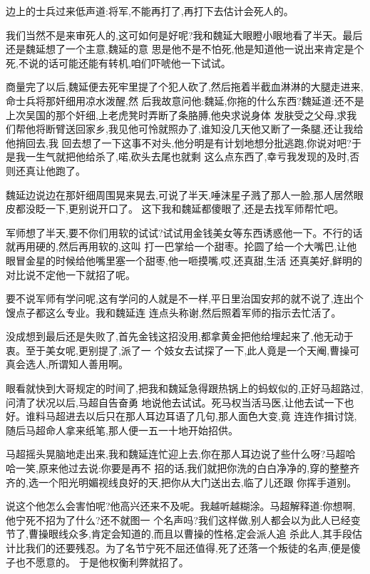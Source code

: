 ﻿\documentclass[12pt,twocolumn]{article}
\begin{document}
边上的士兵过来低声道:将军,不能再打了,再打下去估计会死人的。

我们当然不是来审死人的,这可如何是好呢?我和魏延大眼瞪小眼地看了半天。最后还是魏延想了一个主意,魏延的意
思是他不是不怕死,他是知道他一说出来肯定是个死,不说的话可能还能有转机,咱们吓唬他一下试试。

商量完了以后,魏延便去死牢里提了个犯人砍了,然后拖着半截血淋淋的大腿走进来,命士兵将那奸细用凉水泼醒,然
后我故意问他:魏延,你拖的什么东西?魏延道:还不是上次吴国的那个奸细,上老虎凳时弄断了条胳膊,他央求说身体
发肤受之父母,求我们帮他将断臂送回家乡,我见他可怜就照办了,谁知没几天他又断了一条腿,还让我给他捎回去,我
回去想了一下这事不对头,他分明是有计划地想分批逃跑,你说对吧?于是我一生气就把他给杀了,喏,砍头去尾也就剩
这么点东西了,幸亏我发现的及时,否则还真让他跑了。

魏延边说边在那奸细周围晃来晃去,可说了半天,唾沫星子溅了那人一脸,那人居然眼皮都没眨一下,更别说开口了。
这下我和魏延都傻眼了,还是去找军师帮忙吧。

军师想了半天,要不你们用软的试试?试试用金钱美女等东西诱惑他一下。不行的话就再用硬的,然后再用软的,这叫
打一巴掌给一个甜枣。抡圆了给一个大嘴巴,让他眼冒金星的时候给他嘴里塞一个甜枣,他一咂摸嘴,哎,还真甜,生活
还真美好,鲜明的对比说不定他一下就招了呢。

要不说军师有学问呢,这有学问的人就是不一样,平日里治国安邦的就不说了,连出个馊点子都这么专业。我和魏延连
连点头称谢,然后照着军师的指示去忙活了。

没成想到最后还是失败了,首先金钱这招没用,都拿黄金把他给埋起来了,他无动于衷。至于美女呢,更别提了,派了一
个妓女去试探了一下,此人竟是一个天阉,曹操可真会选人,所谓知人善用啊。

眼看就快到大哥规定的时间了,把我和魏延急得跟热锅上的蚂蚁似的,正好马超路过,问清了状况以后,马超自告奋勇
地说他去试试。死马权当活马医,让他去试一下也好。谁料马超进去以后只在那人耳边耳语了几句,那人面色大变,竟
连连作揖讨饶,随后马超命人拿来纸笔,那人便一五一十地开始招供。

马超摇头晃脑地走出来,我和魏延连忙迎上去,你在那人耳边说了些什么呀?马超哈哈一笑,原来他过去说:你要是再不
招的话,我们就把你洗的白白净净的,穿的整整齐齐的,选一个阳光明媚视线良好的天,把你从大门送出去,临了儿还跟
你挥手道别。

说这个他怎么会害怕呢?他高兴还来不及呢。我越听越糊涂。马超解释道:你想啊,他宁死不招为了什么?还不就图一
个名声吗?我们这样做,别人都会以为此人已经变节了,曹操眼线众多,肯定会知道的,而且以曹操的性格,定会派人追
杀此人,其手段估计比我们的还要残忍。为了名节宁死不屈还值得,死了还落一个叛徒的名声,便是傻子也不愿意的。
于是他权衡利弊就招了。
\end{document}

